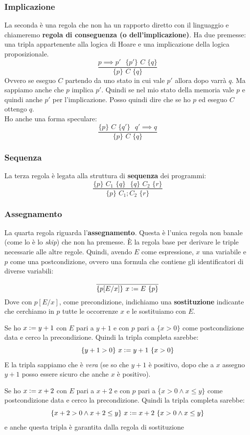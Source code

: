 \documentclass[a4paper,12pt, oneside]{book}
\def\cceq{\mathrel{\vcenter{\hbox{:}}{=}}}
\begin{document}
\subsubsection{Implicazione}
\begin{definizione}
  La seconda è una regola che non ha un rapporto diretto con il linguaggio e
  chiameremo \textbf{regola di conseguenza (o dell'implicazione)}. Ha due
  premesse: una tripla appartenente alla logica di Hoare e una implicazione della
  logica proposizionale.
  \[\frac{p\implies p'\,\, \,\,\{p'\}\,\,C\,\,\{q\}}{\{p\}\,\,C\,\,\{q\}}\]
  Ovvero se eseguo $C$ partendo da uno stato in cui vale $p'$ allora dopo varrà
  $q$. Ma sappiamo anche che $p$ implica $p'$. Quindi se nel mio stato della
  memoria vale $p$ e quindi anche $p'$ per l'implicazione. Posso quindi dire che
  se ho $p$ ed eseguo $C$ ottengo $q$.\\
  Ho anche una forma speculare:
  \[\frac{\{p\}\,\,C\,\,\{q'\}\,\, \,\,q'\implies q}{\{p\}\,\,C\,\,\{q\}}\]
\end{definizione}
\subsubsection{Sequenza}
\begin{definizione}
  La terza regola è legata alla struttura di \textbf{sequenza} dei programmi:
  \[\frac{\{p\}\,\,C_1\,\,\{q\}\,\,
      \,\,\{q\}\,\,C_2\,\,\{r\}}{\{p\}\,\,C_1;C_2\,\,\{r\}}\] 
\end{definizione}
\subsubsection{Assegnamento}
\begin{definizione}
  La quarta regola riguarda l'\textbf{assegnamento}. Questa è l'unica regola
  non banale (come lo è lo \textit{skip}) che non ha premesse. È la regola base
  per derivare le triple necessarie alle altre regole. Quindi, avendo $E$ come
  espressione, $x$ una variabile e $p$ come una postcondizione, ovvero una
  formula che contiene gli identificatori di diverse variabili:
  \[\frac{}{\{p[E/x]\}\,\,x\cceq E\,\,\{p\}}\]
  Dove con $p[E/x]$, come precondizione, indichiamo una \textbf{sostituzione} 
  indicante che cerchiamo in $p$ tutte le occorrenze $x$ e le sostituiamo con $E$.
  \begin{esempio}
    Se ho $x \cceq y+1$ con $E$ pari a $y+1$ e con $p$ pari a $\{x>0\}$ come
    postcondizione data e cerco la precondizione. Quindi la tripla completa
    sarebbe: 
    \[\{y+1>0\}\,\,x \cceq y+1\,\,\{x>0\}\]
    E la tripla sappiamo che è \emph{vera} (se so che $y+1$ è positivo, dopo
    che a $x$ assegno $y+1$ posso essere sicuro che anche $x$ è positivo).
  \end{esempio}
  \begin{esempio}
    Se ho $x \cceq x+2$ con $E$ pari a $x+2$ e con $p$ pari a $\{x>0\land x\leq
    y\}$ come postcondizione data e cerco la precondizione. Quindi la tripla
    completa sarebbe:
    \[\{x+2>0\land x+2\leq y\}\,\,x \cceq x+2\,\,\{x>0\land x\leq y\}\]
    e anche questa tripla è garantita dalla regola di sostituzione
  \end{esempio}
\end{definizione}
\end{document}
